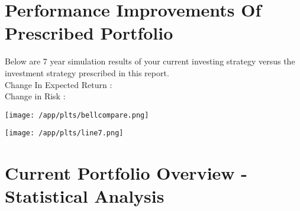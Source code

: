 \documentclass{article}
\begin{document}



\newpage    %

\section{Performance Improvements Of Prescribed Portfolio}

Below are 7 year simulation results of your current investing strategy versus the investment strategy prescribed in this report. \\
Change In Expected Return : {}\\
Change in Risk : {}

\vspace{.4cm}
\begin{center}


\hspace*{-1cm}\texttt{[image: /app/plts/bellcompare.png]}\par

\vspace{.5cm}

\hspace*{-1cm}\texttt{[image: /app/plts/line7.png]}\par
\end{center}

\newpage    %

\section{Current Portfolio Overview - Statistical Analysis}

\vspace{1.5cm}

\end{document}
